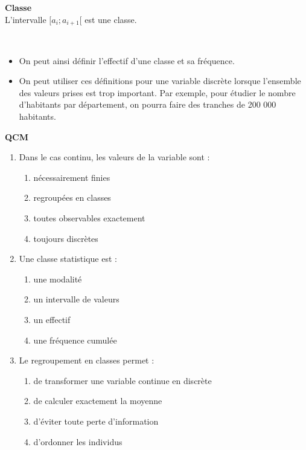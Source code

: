 \documentclass[../PolyS4.tex]{subfiles}
\begin{document}
\begin{Def}\textbf{Classe}\\

L'intervalle $[a_i; a_{i+1}[$ est une classe.
\end{Def}

\begin{Rmq}$\,$

\begin{itemize}
\item On peut ainsi définir l'effectif d'une classe et sa fréquence.
\item On peut utiliser ces définitions pour une variable discrète lorsque l'ensemble des valeurs prises est trop important. Par exemple, pour étudier le nombre d'habitants par département, on pourra faire des tranches de 200 000 habitants.
\end{itemize}
\end{Rmq}

\textbf{QCM}

\begin{enumerate}
\item Dans le cas continu, les valeurs de la variable sont :
\begin{enumerate}
\item nécessairement finies
\item regroupées en classes
\item toutes observables exactement
\item toujours discrètes
\end{enumerate}

\item Une classe statistique est :
\begin{enumerate}
\item une modalité
\item un intervalle de valeurs
\item un effectif
\item une fréquence cumulée
\end{enumerate}

\item Le regroupement en classes permet :
\begin{enumerate}
\item de transformer une variable continue en discrète
\item de calculer exactement la moyenne
\item d'éviter toute perte d'information
\item d'ordonner les individus
\end{enumerate}
\end{enumerate}
\end{document}
